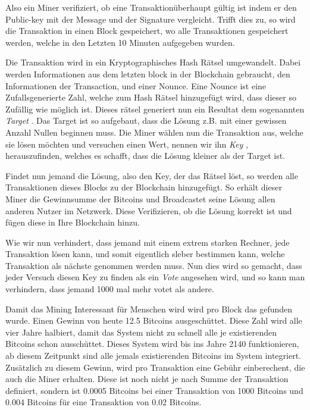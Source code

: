 \noindent
Also ein Miner verifiziert, ob eine Transaktionüberhaupt gültig ist indem er den Public-key mit der Message und der Signature vergleicht. Trifft dies zu, so wird die Transaktion in einen Block gespeichert,
wo alle Transaktionen gespeichert werden, welche in den Letzten 10 Minuten aufgegeben wurden.

\noindent
Die Transaktion wird in ein Kryptographisches Hash Rätsel umgewandelt. Dabei werden Informationen aus dem letzten block in der Blockchain gebraucht, den Informationen der Transaction, und einer Nounce.
Eine Nounce ist eine Zufallsgenerierte Zahl, welche zum Hash Rätsel hinzugefügt wird, dass dieser so Zufällig wie möglich ist. Dieses rätsel generiert nun ein Resultat dem sogenannten \emph{\dq Target \dq}.
Das Target ist so aufgebaut, dass die Lösung z.B. mit einer gewissen Anzahl Nullen beginnen muss. Die Miner wählen nun die Transaktion aus, welche sie lösen möchten und versuchen einen Wert, nennen wir ihn
\emph{\dq Key \dq}, herauszufinden, welches es schafft, dass die Lösung kleiner als der Target ist.

\noindent
Findet nun jemand die Lösung, also den Key, der das Rätsel löst, so werden alle Transaktionen dieses Blocks zu der Blockchain hinzugefügt. So erhält dieser Miner die Gewinnsumme der Bitcoins und Broadcastet
seine Lösung allen anderen Nutzer im Netzwerk. Diese Verifizieren, ob die Lösung korrekt ist und fügen diese in Ihre Blockchain hinzu.

\noindent
Wie wir nun verhindert, dass jemand mit einem extrem starken Rechner, jede Transaktion lösen kann, und somit eigentlich sleber bestimmen kann, welche Transaktion als nächste genommen werden muss.
Nun dies wird so gemacht, dass jeder Versuch diesen Key zu finden als ein \emph{\dq Vote \dq} angesehen wird, und so kann man verhindern, dass jemand 1000 mal mehr votet als andere.

\noindent
Damit das Mining Interessant für Menschen wird wird pro Block das gefunden wurde. Einen Gewinn von heute 12.5 Bitcoins ausgeschüttet. Diese Zahl wird alle vier Jahre halbiert, damit das System nicht
zu schnell alle je existierenden Bitcoins schon ausschüttet. Dieses System wird bis ins Jahre 2140 funktionieren, ab diesem Zeitpunkt sind alle jemals existierenden Bitcoins im System integriert.
Zusätzlich zu diesem Gewinn, wird pro Transaktion eine Gebühr einberechent, die auch die Miner erhalten. Diese ist noch nicht je nach Summe der Transaktion definiert, sondern ist 0.0005 Bitcoins bei
einer Transaktion von 1000 Bitcoins und 0.004 Bitcoins für eine Transaktion von 0.02 Bitcoins.


\newpage
